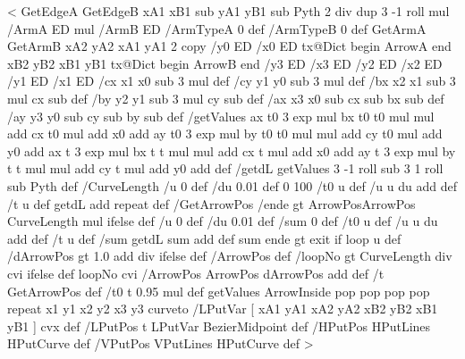 %
<{%
	GetEdgeA GetEdgeB
	xA1 xB1 sub yA1 yB1 sub
	Pyth 2 div dup 3 -1 roll mul
	/ArmA ED
	mul
	/ArmB ED
	/ArmTypeA 0 def
	/ArmTypeB 0 def
	GetArmA GetArmB
	xA2 yA2 xA1 yA1
	2 copy
	/y0 ED /x0 ED
	tx@Dict begin
		ArrowA
	end
	xB2 yB2 xB1 yB1
	tx@Dict begin
		ArrowB
	end
	/y3 ED /x3 ED /y2 ED /x2 ED /y1 ED /x1 ED
	/cx x1 x0 sub 3 mul def
	/cy y1 y0 sub 3 mul def
	/bx x2 x1 sub 3 mul cx sub def
	/by y2 y1 sub 3 mul cy sub def
	/ax x3 x0 sub cx sub bx sub def
	/ay y3 y0 sub cy sub by sub def
	/getValues {
		ax t0 3 exp mul bx t0 t0 mul mul add cx t0 mul add x0 add
		ay t0 3 exp mul by t0 t0 mul mul add cy t0 mul add y0 add
		ax t 3 exp mul bx t t mul mul add cx t mul add x0 add
	ay t 3 exp mul by t t mul mul add cy t mul add y0 add
	} def
	/getdL {
		getValues
		3 -1 roll sub 3 1 roll sub Pyth
	} def
	/CurveLength {
		/u 0 def
		/du 0.01 def
		0 100 {
			/t0 u def
			/u u du add def
			/t u def
			getdL add
		} repeat } def
	/GetArrowPos {
		/ende \psk@ArrowInsidePos{} gt {ArrowPos}{ArrowPos CurveLength mul} ifelse def
		/u 0 def
		/du 0.01 def
		/sum 0 def
		{
			/t0 u def
			/u u du add def
			/t u def
			/sum getdL sum add def
			sum ende gt {exit} if
		} loop u
	} def
	/dArrowPos  gt {%
		1.0  add div
	}{ \psk@ArrowInsidePos } ifelse def
	/ArrowPos \psk@ArrowInsideOffset\space def
	/loopNo \psk@ArrowInsidePos{} gt {%
		CurveLength \psk@ArrowInsidePos\space div cvi
		}{ \psk@ArrowInsideNo } ifelse def
	loopNo cvi {
		/ArrowPos ArrowPos dArrowPos add def
		/t GetArrowPos def
		/t0 t 0.95 mul def
		getValues
		ArrowInside pop pop pop pop
	} repeat
	x1 y1 x2 y2 x3 y3 curveto
	/LPutVar [ xA1 yA1 xA2 yA2 xB2 yB2 xB1 yB1 ] cvx def
	/LPutPos { t LPutVar BezierMidpoint } def
	/HPutPos { { HPutLines } HPutCurve } def
	/VPutPos { { VPutLines } HPutCurve } def
}>
%
\def\parseRP#1;#2;#3\@nil{%
\def\arg@A{#1}\def\arg@B{#2}%
}%
\def\Put{\pst@object{Put}}%
\def\Put@i{\@ifnextchar({\Put@ii{}}{\Put@ii}}%
\def\Put@ii#1(#2)#3{{%
\pst@killglue%
\use@par%
\expandafter\parseRP#1;;\@nil%
\ifx\arg@B\@empty%
  \edef\arg@A{\if@star*\fi%
  \ifx\arg@A\@empty\else[\arg@A]\fi%
  }%
  \edef\pst@tempA{\noexpand\rput\arg@A(#2){\noexpand#3}}\pst@tempA%
\else%
  \edef\arg@A{\if@star*\fi%
  \ifx\arg@A\@empty\else{\arg@A}\fi%
  \ifx\arg@B\@empty[0]\else[\arg@B]\fi%
  }%
  \edef\pst@tempA{\noexpand\uput\arg@A(#2){\noexpand#3}}\pst@tempA%
\fi}\ignorespaces}%
